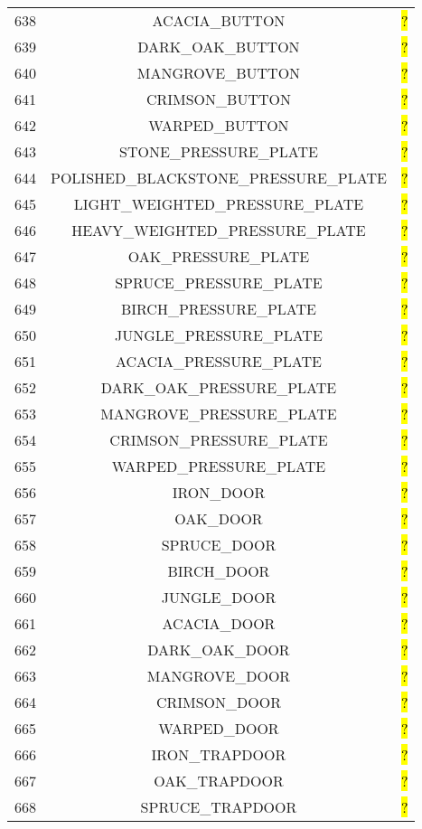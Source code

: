 \documentclass[11pt]{article}
\newcommand\myworries[1]{\sethlcolor{red}\hl{#1}}
\begin{document}
\begin{longtable}{ |c|c|c| }
638 & ACACIA\_BUTTON & \myworries{?} \\
639 & DARK\_OAK\_BUTTON & \myworries{?} \\
640 & MANGROVE\_BUTTON & \myworries{?} \\
641 & CRIMSON\_BUTTON & \myworries{?} \\
642 & WARPED\_BUTTON & \myworries{?} \\
643 & STONE\_PRESSURE\_PLATE & \myworries{?} \\
644 & POLISHED\_BLACKSTONE\_PRESSURE\_PLATE & \myworries{?} \\
645 & LIGHT\_WEIGHTED\_PRESSURE\_PLATE & \myworries{?} \\
646 & HEAVY\_WEIGHTED\_PRESSURE\_PLATE & \myworries{?} \\
647 & OAK\_PRESSURE\_PLATE & \myworries{?} \\
648 & SPRUCE\_PRESSURE\_PLATE & \myworries{?} \\
649 & BIRCH\_PRESSURE\_PLATE & \myworries{?} \\
650 & JUNGLE\_PRESSURE\_PLATE & \myworries{?} \\
651 & ACACIA\_PRESSURE\_PLATE & \myworries{?} \\
652 & DARK\_OAK\_PRESSURE\_PLATE & \myworries{?} \\
653 & MANGROVE\_PRESSURE\_PLATE & \myworries{?} \\
654 & CRIMSON\_PRESSURE\_PLATE & \myworries{?} \\
655 & WARPED\_PRESSURE\_PLATE & \myworries{?} \\
656 & IRON\_DOOR & \myworries{?} \\
657 & OAK\_DOOR & \myworries{?} \\
658 & SPRUCE\_DOOR & \myworries{?} \\
659 & BIRCH\_DOOR & \myworries{?} \\
660 & JUNGLE\_DOOR & \myworries{?} \\
661 & ACACIA\_DOOR & \myworries{?} \\
662 & DARK\_OAK\_DOOR & \myworries{?} \\
663 & MANGROVE\_DOOR & \myworries{?} \\
664 & CRIMSON\_DOOR & \myworries{?} \\
665 & WARPED\_DOOR & \myworries{?} \\
666 & IRON\_TRAPDOOR & \myworries{?} \\
667 & OAK\_TRAPDOOR & \myworries{?} \\
668 & SPRUCE\_TRAPDOOR & \myworries{?} \\

\end{longtable}
\end{document}
